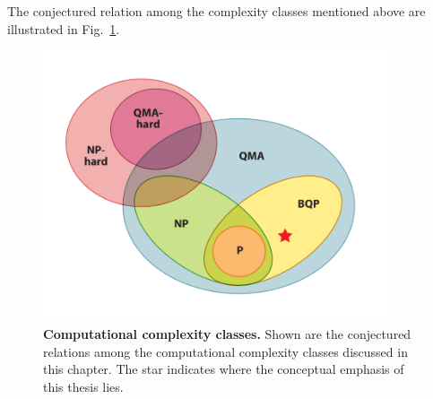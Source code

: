 \documentclass[11pt,oneside,final]{huthesis}%
\begin{document}



The conjectured relation among the complexity classes mentioned above are illustrated in Fig.~\ref{fig:complexity}. 

\begin{figure}
\begin{center}
\includegraphics[width=4in]{./figures/complexity}
\end{center}
\caption{\textbf{Computational complexity classes.} Shown are the conjectured relations among the computational complexity classes discussed in this chapter. The star indicates where the conceptual emphasis of this thesis lies.} %
\label{fig:complexity}
\end{figure}
\end{document}
